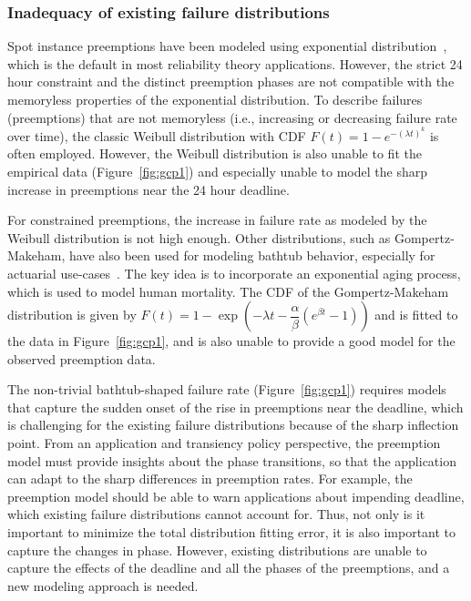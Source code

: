 \documentclass[sigconf]{acmart} %
\newcommand{\subsecspace}[0]{-0.20cm}
\begin{document}
\vspace*{\subsecspace}
\subsubsection{Inadequacy of existing failure distributions}

Spot instance preemptions have been modeled using exponential distribution~\cite{bid-cloud, hotcloud-not-bid, flint}, which is the default in most reliability theory applications. 
However, the strict 24 hour constraint and the distinct preemption phases are not compatible with the memoryless properties of the exponential distribution. 
To describe failures (preemptions) that are not memoryless (i.e., increasing or decreasing failure rate over time), the classic Weibull distribution with CDF $F(t)=1-e^{-(\lambda t)^k}$ is often employed. However, the Weibull distribution is also unable to fit the empirical data (Figure~\ref{fig:gcp1}) and especially unable to model the sharp increase in preemptions near the 24 hour deadline. 

For constrained preemptions, the increase in failure rate as modeled by the Weibull distribution is not high enough.
Other distributions, such as Gompertz-Makeham, have also been used for modeling bathtub behavior, especially  for actuarial use-cases~\cite{missov2013gompertz}. 
The key idea is to incorporate an exponential aging process, which is used to model human mortality.
The CDF of the Gompertz-Makeham distribution is given by $F(t) = 1 - \exp\left(-\lambda t - \dfrac{\alpha}{\beta}(e^{\beta t} - 1) \right)$
and is fitted to the data in Figure~\ref{fig:gcp1}, and is also unable to provide a good model for the observed preemption data.

The non-trivial bathtub-shaped failure rate (Figure~\ref{fig:gcp1}) requires models that capture the sudden onset of the rise in preemptions near the deadline, which is challenging for the existing failure distributions because of the sharp inflection point. 
From an application and transiency policy perspective, the preemption model must provide insights about the phase transitions, so that the application can adapt to the sharp differences in preemption rates.
For example, the preemption model should be able to warn applications about impending deadline, which existing failure distributions cannot account for. 
Thus, not only is it important to minimize the total distribution fitting error, it is also important to capture the changes in phase.
However,
existing distributions are unable to capture the effects of the deadline and all the phases of the preemptions, and a new modeling approach is needed. 
\end{document}
